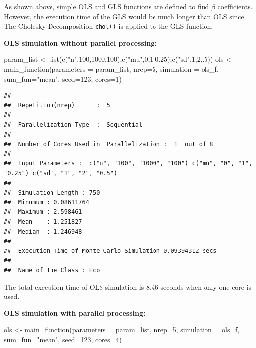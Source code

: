 \documentclass[11pt,a4paper]{article}
\newenvironment{Shaded}{\begin{snugshade}}{\end{snugshade}}
\newcommand{\AttributeTok}[1]{\textcolor[rgb]{0.77,0.63,0.00}{#1}}
\newcommand{\DecValTok}[1]{\textcolor[rgb]{0.00,0.00,0.81}{#1}}
\newcommand{\FloatTok}[1]{\textcolor[rgb]{0.00,0.00,0.81}{#1}}
\newcommand{\FunctionTok}[1]{\textcolor[rgb]{0.00,0.00,0.00}{#1}}
\newcommand{\NormalTok}[1]{#1}
\newcommand{\OtherTok}[1]{\textcolor[rgb]{0.56,0.35,0.01}{#1}}
\newcommand{\StringTok}[1]{\textcolor[rgb]{0.31,0.60,0.02}{#1}}
\begin{document}
As shown above, simple OLS and GLS functions are defined to find
\(\beta\) coefficients. However, the execution time of the GLS would be
much longer than OLS since The Cholesky Decomposition \texttt{chol()} is
applied to the GLS function.

\textbf{OLS simulation without parallel processing:}

\begin{Shaded}
\begin{Highlighting}[]
\NormalTok{ param\_list }\OtherTok{\textless{}{-}} \FunctionTok{list}\NormalTok{(}\FunctionTok{c}\NormalTok{(}\StringTok{"n"}\NormalTok{,}\DecValTok{100}\NormalTok{,}\DecValTok{1000}\NormalTok{,}\DecValTok{100}\NormalTok{),}\FunctionTok{c}\NormalTok{(}\StringTok{"mu"}\NormalTok{,}\DecValTok{0}\NormalTok{,}\DecValTok{1}\NormalTok{,}\FloatTok{0.25}\NormalTok{),}\FunctionTok{c}\NormalTok{(}\StringTok{"sd"}\NormalTok{,}\DecValTok{1}\NormalTok{,}\DecValTok{2}\NormalTok{,.}\DecValTok{5}\NormalTok{))}
\NormalTok{ols }\OtherTok{\textless{}{-}} \FunctionTok{main\_function}\NormalTok{(}\AttributeTok{parameters =}\NormalTok{ param\_list,}
                     \AttributeTok{nrep=}\DecValTok{5}\NormalTok{,}
                     \AttributeTok{simulation =}\NormalTok{ ols\_f,}
                     \AttributeTok{sum\_fun=}\StringTok{"mean"}\NormalTok{,}
                     \AttributeTok{seed=}\DecValTok{123}\NormalTok{,}
                     \AttributeTok{cores=}\DecValTok{1}\NormalTok{)}
\end{Highlighting}
\end{Shaded}

\begin{verbatim}
## 
##  Repetition(nrep)      :  5 
## 
##  Parallelization Type  :  Sequential 
## 
##  Number of Cores Used in  Parallelization :  1  out of 8 
## 
##  Input Parameters :  c("n", "100", "1000", "100") c("mu", "0", "1", "0.25") c("sd", "1", "2", "0.5") 
## 
##  Simulation Length : 750 
##  Minumum : 0.08611764 
##  Maximum : 2.598461 
##  Mean    : 1.251827 
##  Median  : 1.246948 
## 
##  Execution Time of Monte Carlo Simulation 0.09394312 secs 
## 
##  Name of The Class : Eco
\end{verbatim}

The total execution time of OLS simulation is 8.46 seconds when only one
core is used.

\textbf{OLS simulation with parallel processing:}

\begin{Shaded}
\begin{Highlighting}[]
\NormalTok{ols }\OtherTok{\textless{}{-}} \FunctionTok{main\_function}\NormalTok{(}\AttributeTok{parameters =}\NormalTok{ param\_list,}
                     \AttributeTok{nrep=}\DecValTok{5}\NormalTok{,}
                     \AttributeTok{simulation =}\NormalTok{ ols\_f,}
                     \AttributeTok{sum\_fun=}\StringTok{"mean"}\NormalTok{,}
                     \AttributeTok{seed=}\DecValTok{123}\NormalTok{,}
                     \AttributeTok{cores=}\DecValTok{4}\NormalTok{)}
\end{Highlighting}
\end{Shaded}
\end{document}
